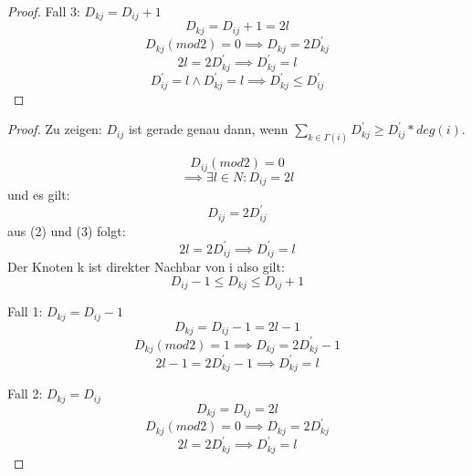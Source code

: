 \documentclass{article}
\begin{document}
\begin{proof}
Fall 3: $D_{kj} = D_{ij}+1$
\begin{equation}
D_{kj} = D_{ij}+1=2l
\end{equation}
\begin{equation}
D_{kj}(mod2) = 0 \implies D_{kj}=2D^{'}_{kj}
\end{equation}
\begin{equation}
2l = 2D^{'}_{kj} \implies D^{'}_{kj}=l
\end{equation}
\begin{equation}
D^{'}_{ij} =l \wedge D^{'}_{kj} =l \implies D^{'}_{kj} \leq D^{'}_{ij}
\end{equation}

\end{proof}
\newpage
\begin{proof}
 Zu zeigen: $D_{ij}$ ist gerade genau dann, wenn $\sum_{k \in \Gamma(i)} D^{'}_{kj} \geq D^{'}_{ij} * deg(i)$.

\begin{equation}
D_{ij}(mod 2) = 0
\end{equation}
\begin{equation}
\implies \exists l \in N: D_{ij} = 2l
\end{equation}
und es gilt:
\begin{equation}
D_{ij} = 2D^{'}_{ij}
\end{equation}
aus (2) und (3) folgt: 
\begin{equation}
2l = 2D^{'}_{ij} \implies D^{'}_{ij} = l
\end{equation}
Der Knoten k ist direkter Nachbar von i also gilt:
\begin{equation}
D_{ij}-1 \leq D_{kj} \leq D_{ij}+1
\end{equation}

Fall 1: $D_{kj} = D_{ij}-1$
\begin{equation}
D_{kj} = D_{ij}-1=2l-1
\end{equation}
\begin{equation}
D_{kj}(mod2) = 1 \implies D_{kj}=2D^{'}_{kj}-1
\end{equation}
\begin{equation}
2l-1 = 2D^{'}_{kj}-1 \implies D^{'}_{kj}=l
\end{equation}

Fall 2: $D_{kj} = D_{ij}$
\begin{equation}
D_{kj} = D_{ij}=2l
\end{equation}
\begin{equation}
D_{kj}(mod2) = 0 \implies D_{kj}=2D^{'}_{kj}
\end{equation}
\begin{equation}
2l = 2D^{'}_{kj} \implies D^{'}_{kj}=l
\end{equation}


\end{proof}
\end{document}
